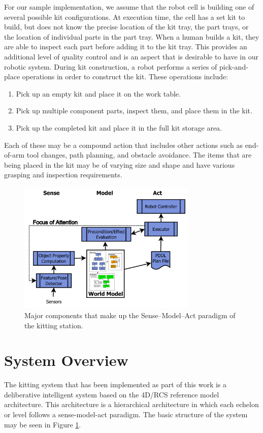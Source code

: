 \documentclass{llncs}
\begin{document}
For our sample implementation, we assume that the robot cell is building one of several possible kit configurations. At execution time, the
cell has a set kit to build, but does not know the precise location of the kit tray, the part trays, or the location of individual parts in the part tray.
When a human builds a kit, they are able to inspect each part before adding it to the kit tray. This provides an additional level of quality control and
is an aspect that is desirable to have in our robotic system. During kit construction,
a robot performs a series of pick-and-place operations
in order to construct the kit. These operations include:
\begin{enumerate}
\item Pick up an empty kit and place it on the work table.
\item Pick up multiple component parts, inspect them, and place them in the kit.
\item Pick up the completed kit and place it in the full kit storage area.
\end{enumerate}
Each of these may be a compound action that includes
other actions such as end-of-arm tool changes, path planning,
and obstacle avoidance. The items that are being placed in the kit may be of varying size and shape and have various grasping and inspection
requirements.
%
\begin{figure}[htb!]
\begin{center}
\includegraphics[width=8.5cm]{images/RITAExecution.jpg}
\caption{Major components that make up the Sense--Model--Act paradigm of the kitting station.}
\label{fig:SenseModelAct}
\end{center}
\end{figure}
%
%
\section{System Overview}
\label{sect:overview}
The kitting system that has been implemented as part of this work is a deliberative intelligent system based on the 4D/RCS 
reference model architecture\cite{Albus2000}. This architecture is a hierarchical architecture in which each echelon or level
follows a sense-model-act paradigm. The basic structure of the system may be seen in Figure \ref{fig:SenseModelAct}.
%
\end{document}
